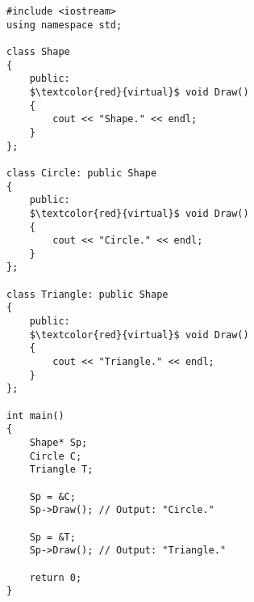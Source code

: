 \documentclass[12pt,a4paper]{article}
\begin{document}
\begin{lstlisting}[caption={Virtual Functions}, escapechar=$]
#include <iostream>
using namespace std;

class Shape
{
	public:
	$\textcolor{red}{virtual}$ void Draw()
	{
		cout << "Shape." << endl;
	}
};

class Circle: public Shape
{
	public:
	$\textcolor{red}{virtual}$ void Draw()
	{
		cout << "Circle." << endl;
	}
};

class Triangle: public Shape
{
	public:
	$\textcolor{red}{virtual}$ void Draw()
	{
		cout << "Triangle." << endl;
	}
};

int main()
{
	Shape* Sp;
	Circle C;
	Triangle T;

	Sp = &C;
	Sp->Draw(); // Output: "Circle."

	Sp = &T;
	Sp->Draw(); // Output: "Triangle."

	return 0;
}
\end{lstlisting}
\end{document}
